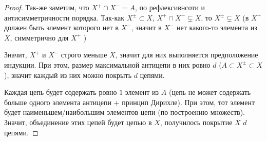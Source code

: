 \begin{theorem}
\begin{proof}
        Так-же заметим, что $X^{+}\cap X^{-} = A$, по рефлексивнсоти и антисимметричности порядка. Так-как $X^{\pm} \subset X$, $X^{+}\cap X^{-} \subsetneq X$, то $X^{\pm} \subsetneq X$ (в $X^{+}$ должен быть элемент которого нет в $X^{-}$, значит в $X^{-}$ нет какого-то элемента из $X$, симметрично для  $X^{+}$ ) 

        Значит, $X^{+}$ и $X^{-}$ строго меньше $X$, значит для них выполняется предположение индукции. При этом, размер максимальной антицепи в них ровно $d$ ($A \subset X^{\pm} \subset X$), значит каждый из них можно покрыть $d$ цепями.

        Каждая цепь будет содержать ровно $1$ элемент из $A$ (цепь не может содержать больше одного элемента антицепи + принцип Дирихле). При этом, тот элемент будет наименьшем/наибольшим элементов цепи (по построению множеств). Значит, объединение этих цепей будет цепью в $X$, получилось покрытие $X$ $d$ цепями.
    \end{proof}
\end{theorem}
